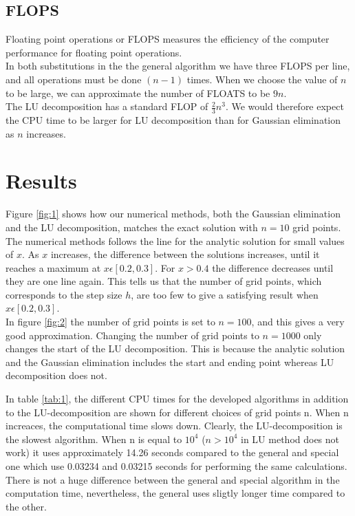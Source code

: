 \documentclass{article}
\begin{document}
\subsection{FLOPS}
Floating point operations or FLOPS measures the efficiency of the computer performance for floating point operations. \\
In both substitutions in the the general algorithm we have three FLOPS per line, and all operations must be done $(n-1)$ times. When we choose the value of $n$ to be large, we can approximate the number of FLOATS to be $9n$. \\
The LU decomposition has a standard FLOP of $\frac{2}{3}n^{3}$. We would therefore expect the CPU time to be larger for LU decomposition than for Gaussian elimination as $n$ increases. 


\section{Results}
Figure \ref{fig:1} shows how our numerical methods, both the Gaussian elimination and the LU decomposition, matches the exact solution with $n=10$ grid points. The numerical methods follows the line for the analytic solution for small values of $x$. As $x$ increases, the difference between the solutions increases, until it reaches a maximum at $x \epsilon [0.2, 0.3]$. For $x > 0.4$ the difference decreases until they are one line again. This tells us that the number of grid points, which corresponds to the step size $h$, are too few to give a satisfying result when $x \epsilon [0.2, 0.3] $. \\
In figure \ref{fig:2} the number of grid points is set to $n=100$, and this gives a very good approximation. Changing the number of grid points to $n=1000$ only changes the start of the LU decomposition. This is because the analytic solution and the Gaussian elimination includes the start and ending point whereas LU decomposition does not. 

In  table \ref{tab:1}, the different CPU times for the developed algorithms in addition to the LU-decomposition are shown for different choices of grid points n. When n increaces, the computational time slows down. Clearly, the LU-decomposition is the slowest algorithm. When n is equal to $10^4$ ($n>10^4$ in LU method does not work) it uses approximately 14.26 seconds compared to the general and special one which use 0.03234 and 0.03215 seconds for performing the same calculations. There is not a huge difference between the general and special algorithm in the computation time, nevertheless, the general uses sligtly longer time compared to the other. 
\end{document}
